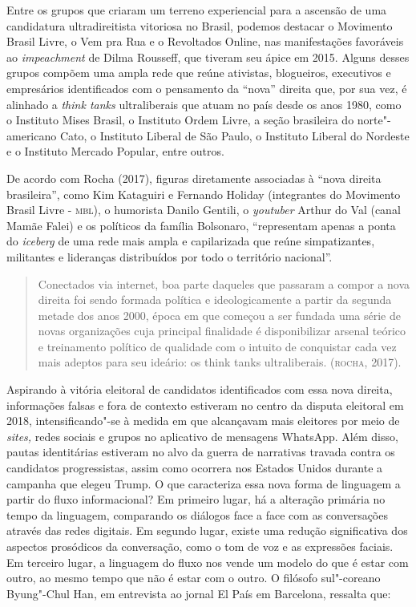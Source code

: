 Entre os grupos que criaram um terreno experiencial para a ascensão de
uma candidatura ultradireitista vitoriosa no Brasil, podemos destacar o
Movimento Brasil Livre, o Vem pra Rua e o Revoltados Online, nas
manifestações favoráveis ao \emph{impeachment} de Dilma Rousseff, que
tiveram seu ápice em 2015. Alguns desses grupos compõem uma ampla rede
que reúne ativistas, blogueiros, executivos e empresários identificados
com o pensamento da ``nova'' direita que, por sua vez, é alinhado a
\emph{think tanks} ultraliberais que atuam no país desde os anos 1980,
como o Instituto Mises Brasil, o Instituto Ordem Livre, a seção
brasileira do norte"-americano Cato, o Instituto Liberal de São Paulo, o
Instituto Liberal do Nordeste e o Instituto Mercado Popular, entre
outros.

De acordo com Rocha (2017), figuras diretamente associadas à ``nova
direita brasileira'', como Kim Kataguiri e Fernando Holiday (integrantes
do Movimento Brasil Livre - \textsc{mbl}), o humorista Danilo Gentili, o
\emph{youtuber} Arthur do Val (canal Mamãe Falei) e os políticos da
família Bolsonaro, ``representam apenas a ponta do \emph{iceberg} de uma
rede mais ampla e capilarizada que reúne simpatizantes, militantes e
lideranças distribuídos por todo o território nacional''.

\begin{quote}
Conectados via internet, boa parte daqueles que passaram a compor a nova
direita foi sendo formada política e ideologicamente a partir da segunda
metade dos anos 2000, época em que começou a ser fundada uma série de
novas organizações cuja principal finalidade é disponibilizar arsenal
teórico e treinamento político de qualidade com o intuito de conquistar
cada vez mais adeptos para seu ideário: os think tanks ultraliberais.
(\textsc{rocha}, 2017).
\end{quote}

Aspirando à vitória eleitoral de candidatos identificados com essa nova
direita, informações falsas e fora de contexto estiveram no centro da
disputa eleitoral em 2018, intensificando"-se à medida em que alcançavam
mais eleitores por meio de \emph{sites,} redes sociais e grupos no
aplicativo de mensagens WhatsApp. Além disso, pautas identitárias
estiveram no alvo da guerra de narrativas travada contra os candidatos
progressistas, assim como ocorrera nos Estados Unidos durante a campanha
que elegeu Trump. O que caracteriza essa nova forma de linguagem a
partir do fluxo informacional? Em primeiro lugar, há a alteração
primária no tempo da linguagem, comparando os diálogos face a face com
as conversações através das redes digitais. Em segundo lugar, existe uma
redução significativa dos aspectos prosódicos da conversação, como o tom
de voz e as expressões faciais. Em terceiro lugar, a linguagem do fluxo
nos vende um modelo do que é estar com outro, ao mesmo tempo que não é
estar com o outro. O filósofo sul"-coreano Byung"-Chul Han, em entrevista
ao jornal El País em Barcelona, ressalta que:

